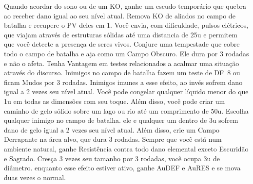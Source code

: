 %
\vfill
%
{Quando acordar do sono ou de um KO, ganhe um escudo temporário que quebra ao receber dano igual ao seu nível atual.}
{Remova KO de aliados no campo de batalha e recupere o PV deles em 1.}
%
\vfill
%
{Você envia, com dificuldade, pulsos elétricos, que viajam através de estruturas sólidas até uma distancia de 25u e permitem que você detecte a presença de seres vivos.}
{Conjure uma tempestade que cobre todo o campo de batalha e aja como um Campo Obscuro. Ele dura por 3 rodadas e não o afeta.}
%
\vfill
%
{Tenha Vantagem em testes relacionados a acalmar uma situação através do discurso.}
{Inimigos no campo de batalha fazem um teste de DF~8 ou ficam Mudos por 3 rodadas. Inimigos imunes a esse efeito, ao invés sofrem dano igual a 2 vezes seu nível atual.}
%
\vfill
%
{Você pode congelar qualquer líquido menor do que 1u em todas as dimensões com seu toque. Além disso, você pode criar um caminho de gelo sólido sobre um lago ou rio até um comprimento de 50u.}
{Escolha qualquer inimigo no campo de batalha. ele e qualquer um dentro de 3u sofrem dano de gelo igual a 2 vezes seu nível atual. Além disso, crie um Campo Derrapante na área alvo, que dura 3 rodadas.}
%
\vfill
%
{Sempre que você está num ambiente natural, ganhe Resistência contra todo dano elemental exceto Escuridão e Sagrado.}
{Cresça 3 vezes seu tamanho por 3 rodadas, você ocupa 3u de diâmetro. enquanto esse efeito estiver ativo, ganhe AuDEF e AuRES e se mova duas vezes o normal.}
%
\clearpage
